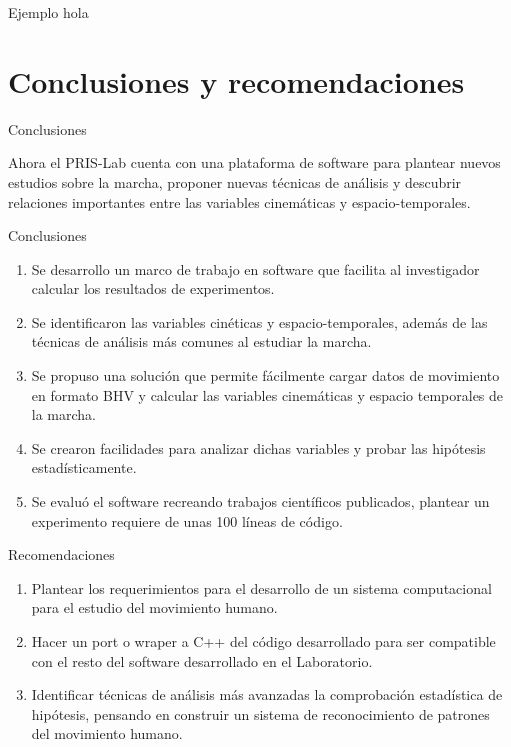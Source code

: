 \documentclass{beamer} %
\begin{document}
\begin{frame}{Ejemplo}
   hola 
\end{frame}

\section{Conclusiones y recomendaciones}

\begin{frame}{Conclusiones}
    \begin{block}{}
        Ahora el PRIS-Lab cuenta con una plataforma de software para plantear nuevos estudios sobre la marcha, proponer nuevas técnicas de análisis y descubrir relaciones importantes entre las variables cinemáticas y espacio-temporales. 
    \end{block}
\end{frame}

\begin{frame}{Conclusiones}
    \begin{enumerate}
        \item Se desarrollo un marco de trabajo en software que facilita al investigador calcular los resultados de experimentos. 
        \item Se identificaron las variables cinéticas y espacio-temporales, además de las técnicas de análisis más comunes al estudiar la marcha. 
        \item Se propuso una solución que permite fácilmente cargar datos de movimiento en formato BHV y calcular las variables cinemáticas y espacio temporales de la marcha.
        \item Se crearon facilidades para analizar dichas variables y probar las hipótesis estadísticamente. 
        \item Se evaluó el software recreando trabajos científicos publicados, plantear un experimento requiere de unas 100 líneas de código.
    \end{enumerate}
\end{frame}

\begin{frame}{Recomendaciones}
    \begin{enumerate}
        \item Plantear los requerimientos para el desarrollo de un sistema computacional para el estudio del movimiento humano. 
        \item Hacer un port o wraper a C++ del código desarrollado para ser compatible con el resto del software desarrollado en el Laboratorio. 
        \item Identificar técnicas de análisis más avanzadas la comprobación estadística de hipótesis, pensando en construir un sistema de reconocimiento de patrones del movimiento humano. 
    \end{enumerate}
\end{frame}


\end{document}
